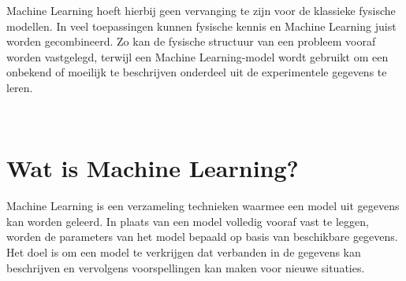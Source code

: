 \documentclass{ximera}
\begin{document}
\begin{remark} \text{ }

    Machine Learning hoeft hierbij geen vervanging te zijn voor de klassieke fysische modellen. In veel toepassingen kunnen fysische kennis en Machine Learning juist worden gecombineerd. Zo kan de fysische structuur van een probleem vooraf worden vastgelegd, terwijl een Machine Learning-model wordt gebruikt om een onbekend of moeilijk te beschrijven onderdeel uit de experimentele gegevens te leren.
\end{remark} 
\text{ } \\ 

\section*{Wat is Machine Learning?}

Machine Learning is een verzameling technieken waarmee een model uit gegevens kan worden geleerd. In plaats van een model volledig vooraf vast te leggen, worden de parameters van het model bepaald op basis van beschikbare gegevens.
Het doel is om een model te verkrijgen dat verbanden in de gegevens kan beschrijven en vervolgens voorspellingen kan maken voor nieuwe situaties.
\end{document}
